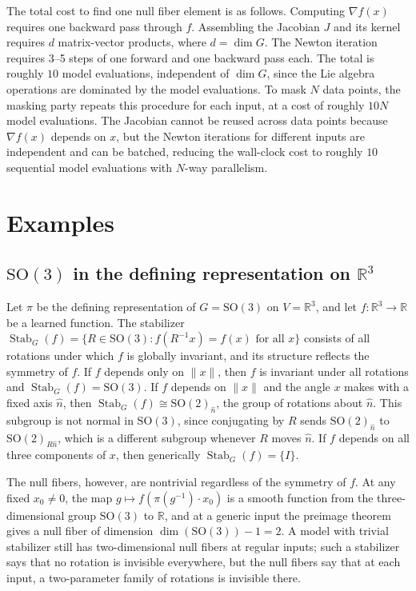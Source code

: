 \documentclass[11pt]{article}
\DeclareMathOperator{\Stab}{Stab}
\newcommand{\RR}{\mathbb{R}}
\begin{document}
The total cost to find one null fiber element is as follows. Computing $\nabla f(x)$ requires one backward pass through $f$. Assembling the Jacobian $J$ and its kernel requires $d$ matrix-vector products, where $d = \dim G$. The Newton iteration requires 3--5 steps of one forward and one backward pass each. The total is roughly $10$ model evaluations, independent of $\dim G$, since the Lie algebra operations are dominated by the model evaluations. To mask $N$ data points, the masking party repeats this procedure for each input, at a cost of roughly $10N$ model evaluations. The Jacobian cannot be reused across data points because $\nabla f(x)$ depends on $x$, but the Newton iterations for different inputs are independent and can be batched, reducing the wall-clock cost to roughly $10$ sequential model evaluations with $N$-way parallelism.

\section{Examples}\label{sec:examples}

\subsection{$\mathrm{SO}(3)$ in the defining representation on $\RR^3$}\label{ex:so3-action}

Let $\pi$ be the defining representation of $G = \mathrm{SO}(3)$ on $V = \RR^3$, and let $f\colon \RR^3 \to \RR$ be a learned function. The stabilizer $\Stab_G(f) = \{R \in \mathrm{SO}(3) : f(R^{-1}x) = f(x) \text{ for all } x\}$ consists of all rotations under which $f$ is globally invariant, and its structure reflects the symmetry of $f$. If $f$ depends only on $\|x\|$, then $f$ is invariant under all rotations and $\Stab_G(f) = \mathrm{SO}(3)$. If $f$ depends on $\|x\|$ and the angle $x$ makes with a fixed axis $\hat{n}$, then $\Stab_G(f) \cong \mathrm{SO}(2)_{\hat{n}}$, the group of rotations about $\hat{n}$. This subgroup is not normal in $\mathrm{SO}(3)$, since conjugating by $R$ sends $\mathrm{SO}(2)_{\hat{n}}$ to $\mathrm{SO}(2)_{R\hat{n}}$, which is a different subgroup whenever $R$ moves $\hat{n}$. If $f$ depends on all three components of $x$, then generically $\Stab_G(f) = \{I\}$.

The null fibers, however, are nontrivial regardless of the symmetry of $f$. At any fixed $x_0 \neq 0$, the map $g \mapsto f(\pi(g^{-1}) \cdot x_0)$ is a smooth function from the three-dimensional group $\mathrm{SO}(3)$ to $\RR$, and at a generic input the preimage theorem gives a null fiber of dimension $\dim(\mathrm{SO}(3)) - 1 = 2$. A model with trivial stabilizer still has two-dimensional null fibers at regular inputs; such a stabilizer says that no rotation is invisible everywhere, but the null fibers say that at each input, a two-parameter family of rotations is invisible there.
\end{document}
